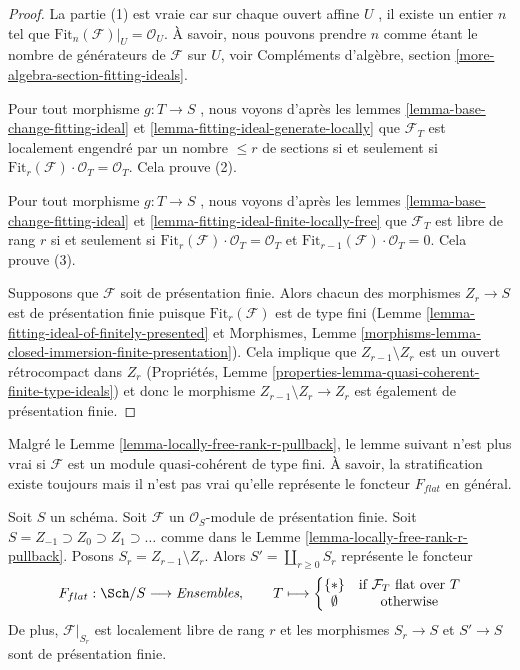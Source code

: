\begin{proof}
La partie (1) est vraie car sur chaque ouvert affine  $U$ , il existe un
entier  $n$  tel que  $\text{Fit}_n(\mathcal{F})|_U = \mathcal{O}_U$. À savoir, nous pouvons prendre
 $n$  comme étant le nombre de générateurs de  $\mathcal{F}$  sur
 $U$, voir Compléments d'algèbre, section  \ref{more-algebra-section-fitting-ideals}.

\medskip\noindent
Pour tout morphisme  $g : T \to S$ , nous voyons d'après les lemmes  \ref{lemma-base-change-fitting-ideal}  et
 \ref{lemma-fitting-ideal-generate-locally}  que  $\mathcal{F}_T$  est localement engendré par un nombre  $\leq r$  de sections si
et seulement si  $\text{Fit}_r(\mathcal{F}) \cdot \mathcal{O}_T = \mathcal{O}_T$. Cela prouve (2).

\medskip\noindent
Pour tout morphisme  $g : T \to S$ , nous voyons d'après les lemmes  \ref{lemma-base-change-fitting-ideal}  et
 \ref{lemma-fitting-ideal-finite-locally-free}  que  $\mathcal{F}_T$  est libre de rang  $r$  si et seulement si
 $\text{Fit}_r(\mathcal{F}) \cdot \mathcal{O}_T = \mathcal{O}_T$  et  $\text{Fit}_{r - 1}(\mathcal{F}) \cdot \mathcal{O}_T = 0$. Cela prouve (3).

\medskip\noindent
Supposons que  $\mathcal{F}$  soit de présentation finie. Alors chacun des morphismes
 $Z_r \to S$  est de présentation finie puisque  $\text{Fit}_r(\mathcal{F})$  est de type fini
(Lemme  \ref{lemma-fitting-ideal-of-finitely-presented}  et Morphismes, Lemme  \ref{morphisms-lemma-closed-immersion-finite-presentation}). Cela implique que
 $Z_{r - 1} \setminus Z_r$  est un ouvert rétrocompact dans  $Z_r$  (Propriétés, Lemme
 \ref{properties-lemma-quasi-coherent-finite-type-ideals}) et donc le morphisme  $Z_{r - 1} \setminus Z_r \to Z_r$  est également de présentation
finie.
\end{proof}

\noindent
Malgré le Lemme  \ref{lemma-locally-free-rank-r-pullback}, le lemme suivant n'est plus vrai si
 $\mathcal{F}$  est un module quasi-cohérent de type fini. À savoir, la
stratification existe toujours mais il n'est pas vrai qu'elle représente le
foncteur  $F_{flat}$  en général.

\begin{lemma}
\label{lemma-finite-presentation-module}
Soit  $S$  un schéma. Soit  $\mathcal{F}$  un  $\mathcal{O}_S$-module de
présentation finie. Soit  $S = Z_{-1} \supset Z_0 \supset Z_1 \supset \ldots$  comme dans le Lemme  \ref{lemma-locally-free-rank-r-pullback}. Posons
 $S_r = Z_{r - 1} \setminus Z_r$. Alors  $S' = \coprod_{r \geq 0} S_r$  représente le foncteur
$$
F_{flat} : \Sch/S \longrightarrow \textit{Ensembles},\quad\quad
T \longmapsto
\left\{
\begin{matrix}
\{*\} & \text{if }\mathcal{F}_T\text{ flat over }T\\
\emptyset & \text{otherwise}
\end{matrix}
\right.
$$
De plus,  $\mathcal{F}|_{S_r}$  est localement libre de rang  $r$  et les morphismes
 $S_r \to S$  et  $S' \to S$  sont de présentation finie.
\end{lemma}

